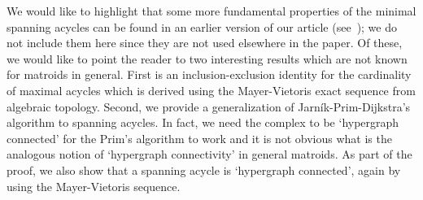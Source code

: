 \documentclass[12pt]{amsart}
\newcommand{\dy}[1]{\textcolor{magenta}{#1}}
\newcommand{\gt}[1]{\textcolor{blue}{#1}}
\renewcommand{\dy}[1]{#1}
\renewcommand{\gt}[1]{#1}
\numberwithin{equation}{section}
\numberwithin{theorem}{section}
\newcommand{\1}{\mathbf{1}}
\begin{document}
\dy{We would like to \gt{highlight} that some more fundamental properties of the minimal spanning acycles can be found in an earlier version of our article (see~\cite{Skraba17}); we do not include them here since they are not used elsewhere in the paper. Of these, we would like to point the reader to two interesting results which are not known for matroids in general. First is an inclusion-exclusion identity for the cardinality of maximal acycles which is derived using the Mayer-Vietoris exact sequence from algebraic topology. Second, we provide a generalization of Jarn\'ik-Prim-Dijkstra's algorithm to spanning acycles. In fact, we need the complex to be `hypergraph connected' for the Prim's algorithm to work and it is not obvious what is the analogous notion of `hypergraph connectivity' in general matroids. As part of the proof, we also show that a spanning acycle is `hypergraph connected', again by using the Mayer-Vietoris sequence.}
\end{document}
